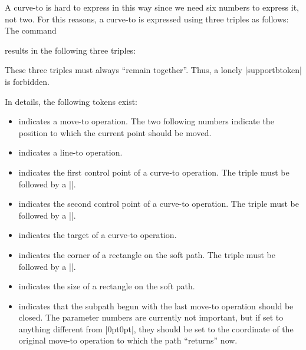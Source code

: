 A curve-to is hard to express in this way since we need six numbers to express
it, not two. For this reasons, a curve-to is expressed using three triples as
follows: The command
%
\begin{codeexample}
\pgfsyssoftpath@curveto{1bp}{2bp}{3bp}{4bp}{5bp}{6bp}
\end{codeexample}
%
\noindent results in the following three triples:
%
\begin{codeexample}
\pgfsyssoftpath@curvetosupportatoken{1bp}{2bp}
\pgfsyssoftpath@curvetosupportbtoken{3bp}{4bp}
\pgfsyssoftpath@curvetotoken{5bp}{6bp}
\end{codeexample}

These three triples must always ``remain together''. Thus, a lonely
|supportbtoken| is forbidden.

In details, the following tokens exist:
%
\begin{itemize}
    \item {} indicates a move-to
        operation. The two following numbers indicate the position to which the
        current point should be moved.
    \item {} indicates a line-to
        operation.
    \item {} indicates the first
        control point of a curve-to operation. The triple must be followed by a
        |\pgfsyssoftpath@curvetosupportbtoken|.
    \item {} indicates the second
        control point of a curve-to operation. The triple must be followed by a
        |\pgfsyssoftpath@curvetotoken|.
    \item {} indicates the target of a
        curve-to operation.
    \item {} indicates the corner of a
        rectangle on the soft path. The triple must be followed by a
        |\pgfsyssoftpath@rectsizetoken|.
    \item {} indicates the size of a
        rectangle on the soft path.
    \item {} indicates that the subpath
        begun with the last move-to operation should be closed. The parameter
        numbers are currently not important, but if set to anything different
        from |{0pt}{0pt}|, they should be set to the coordinate of the original
        move-to operation to which the path ``returns'' now.
\end{itemize}
